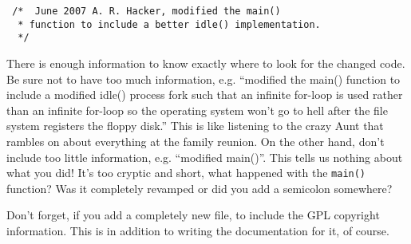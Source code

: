 \begin{Verbatim} 
 /*  June 2007 A. R. Hacker, modified the main()
  * function to include a better idle() implementation. 
  */ 
\end{Verbatim}
There is enough information to know exactly where to look for the changed code. Be sure not to have too much information, e.g. ``modified the main() function to include a modified idle() process fork such that an infinite for-loop is used rather than an infinite for-loop so the operating system won't go to hell after the file system registers the floppy disk.'' This is like listening to the crazy Aunt that rambles on about everything at the family reunion. On the other hand, don't include too little information, e.g. ``modified main()''. This tells us nothing about what you did! It's too cryptic and short, what happened with the \verb|main()| function? Was it completely revamped or did you add a semicolon somewhere?

Don't forget, if you add a completely new file, to include the GPL copyright information. This is in addition to writing the documentation for it, of course.
